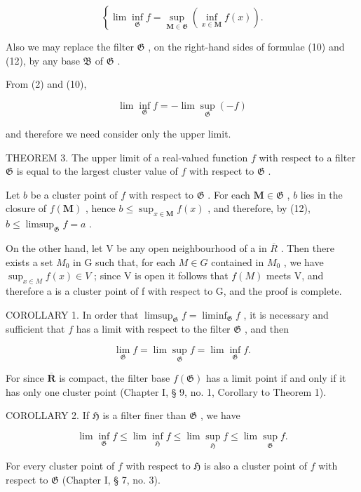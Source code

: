 \[
\left\{\lim \inf _ {\mathfrak {G}} f = \sup _ {\mathbf {M} \in \mathfrak {G}} (\inf _ {x \in \mathbf {M}} f (x)). \right.
\]

Also we may replace the filter \(\mathfrak{G}\) , on the right-hand sides of formulae (10) and (12), by any base \(\mathfrak{B}\) of \(\mathfrak{G}\) .

From (2) and (10),

\[
\lim \inf _ {\mathfrak {G}} f = - \lim \sup _ {\mathfrak {G}} (- f)\tag{13}
\]

and therefore we need consider only the upper limit.

THEOREM 3. The upper limit of a real-valued function \(f\) with respect to a filter \(\mathfrak{G}\) is equal to the largest cluster value of \(f\) with respect to \(\mathfrak{G}\) .

Let \(b\) be a cluster point of \(f\) with respect to \(\mathfrak{G}\) . For each \(\mathbf{M} \in \mathfrak{G}\) , \(b\) lies in the closure of \(f(\mathbf{M})\) , hence \(b \leqslant \sup_{x \in \mathbf{M}} f(x)\) , and therefore, by (12), \(b \leqslant \limsup_{\mathfrak{G}} f = a\) .

On the other hand, let V be any open neighbourhood of a in \(\overline{R}\) . Then there exists a set \(M_{0}\) in G such that, for each \(M \in G\) contained in \(M_{0}\) , we have \(\sup_{x \in M} f(x) \in V\) ; since V is open it follows that \(f(M)\) meets V, and therefore a is a cluster point of f with respect to G, and the proof is complete.

COROLLARY 1. In order that \(\limsup_{\mathfrak{G}}f = \liminf_{\mathfrak{G}}f\) , it is necessary and sufficient that \(f\) has a limit with respect to the filter \(\mathfrak{G}\) , and then

\[
\lim _ {\mathfrak {G}} f = \lim \sup _ {\mathfrak {G}} f = \lim \inf _ {\mathfrak {G}} f.
\]

For since \(\overline{\mathbf{R}}\) is compact, the filter base \(f(\mathfrak{G})\) has a limit point if and only if it has only one cluster point (Chapter I, § 9, no. 1, Corollary to Theorem 1).

COROLLARY 2. If \(\mathfrak{H}\) is a filter finer than \(\mathfrak{G}\) , we have

\[
\lim \inf _ {\mathfrak {G}} f \leqslant \lim \inf _ {\mathfrak {H}} f \leqslant \lim \sup _ {\mathfrak {H}} f \leqslant \lim \sup _ {\mathfrak {G}} f.
\]

For every cluster point of \(f\) with respect to \(\mathfrak{H}\) is also a cluster point of \(f\) with respect to \(\mathfrak{G}\) (Chapter I, § 7, no. 3).

